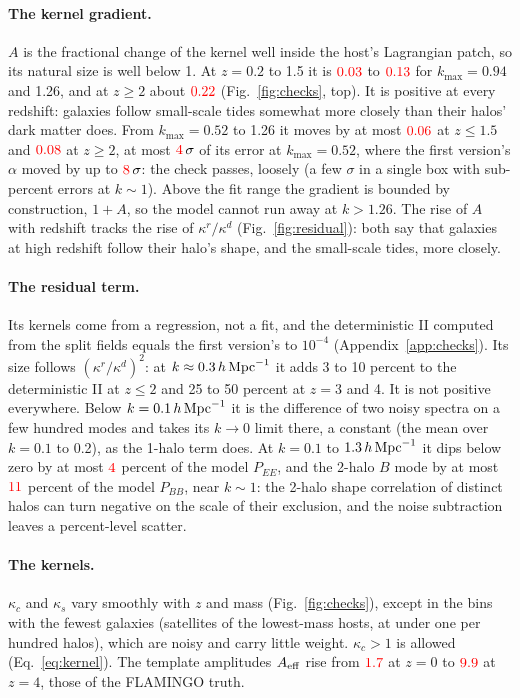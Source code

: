 \documentclass[11pt]{article}
\newcommand{\hMpc}{\,h\,{\rm Mpc}^{-1}}
\newcommand{\kmax}{k_{\max}}
\newcommand{\kc}{\kappa_c}
\newcommand{\ks}{\kappa_s}
\newcommand{\Aeff}{A_{\rm eff}}
\newif\ifnumbersfinal
\newcommand{\refresh}[1]{\ifnumbersfinal#1\else\textcolor{red}{#1}\fi}
\newcommand{\Kfit}{1.26}        %
\begin{document}
\paragraph{The kernel gradient.} $A$ is the fractional change of the
kernel well inside the host's Lagrangian patch, so its natural size is
well below 1. At $z=0.2$ to 1.5 it is $\refresh{\ALo}$ to $\refresh{\AHi}$
for $\kmax=0.94$ and 1.26, and at $z\ge2$ about $\refresh{\AHighFit}$
(Fig.~\ref{fig:checks}, top). It is positive at every redshift: galaxies
follow small-scale tides somewhat more closely than their halos' dark
matter does. From $\kmax=0.52$ to 1.26 it moves by at most
$\refresh{\AShiftMid}$ at $z\le1.5$ and $\refresh{\AShiftHigh}$ at
$z\ge2$, at most $\refresh{\AShiftSig}\,\sigma$ of its error at
$\kmax=0.52$, where the first version's $\alpha$ moved by up to
$\refresh{\alphaShiftHighSig}\,\sigma$: the check passes, loosely (a few
$\sigma$ in a single box with sub-percent errors at $k\sim1$). Above the fit
range the gradient is bounded by construction, $1+A$, so the model cannot
run away at $k>\Kfit$. The rise of $A$ with redshift tracks the rise of
$\kappa^r/\kappa^d$ (Fig.~\ref{fig:residual}): both say that galaxies at
high redshift follow their halo's shape, and the small-scale tides, more
closely.

\paragraph{The residual term.} Its kernels come from a regression, not a
fit, and the deterministic II computed from the split fields equals the
first version's to $10^{-4}$ (Appendix~\ref{app:checks}). Its size
follows $(\kappa^r/\kappa^d)^2$: at $k\approx0.3\hMpc$ it adds 3 to 10
percent to the deterministic II at $z\le2$ and 25 to 50 percent at $z=3$
and 4. It is not positive everywhere. Below $k=0.1\hMpc$ it is the
difference of two noisy spectra on a few hundred modes and takes its
$k\to0$ limit there, a constant (the mean over $k=0.1$ to 0.2), as the
1-halo term does. At $k=0.1$ to $1.3\hMpc$ it dips below zero by at most
$\refresh{\negIIMax}$ percent of the model $P_{EE}$, and the 2-halo $B$
mode by at most $\refresh{\negBBMax}$ percent of the model $P_{BB}$, near
$k\sim1$: the 2-halo shape correlation of distinct halos can turn negative
on the scale of their exclusion, and the noise subtraction leaves a
percent-level scatter.

\paragraph{The kernels.} $\kc$ and $\ks$ vary smoothly with $z$ and mass
(Fig.~\ref{fig:checks}), except in the bins with the fewest galaxies
(satellites of the lowest-mass hosts, at under one per hundred halos), which
are noisy and carry little weight. $\kc>1$ is allowed
(Eq.~\ref{eq:kernel}). The
template amplitudes $\Aeff$ rise from $\refresh{\AeffLo}$ at $z=0$ to
$\refresh{\AeffHi}$ at $z=4$, those of the FLAMINGO truth.
\end{document}
